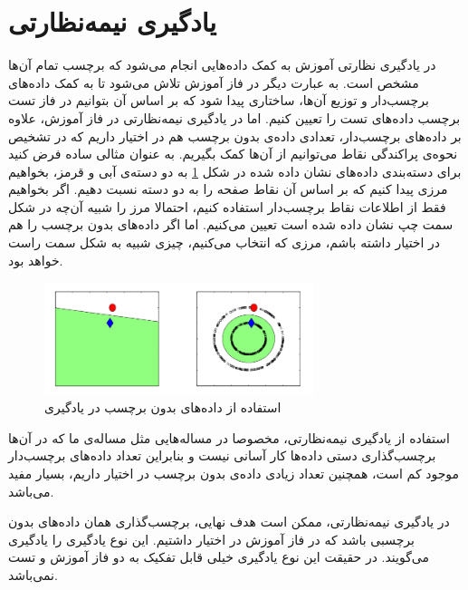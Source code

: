 \documentclass[11pt]{article}
\begin{document}
\section{
یادگیری نیمه‌نظارتی
}
در یادگیری نظارتی
آموزش به کمک داده‌هایی انجام می‌شود که برچسب تمام آن‌ها مشخص است. به عبارت دیگر در فاز آموزش تلاش می‌شود تا به کمک داده‌های برچسب‌دار و توزیع آن‌ها، ساختاری پیدا شود که بر اساس آن بتوانیم در فاز تست برچسب داده‌های تست را تعیین کنیم. اما در یادگیری نیمه‌نظارتی 
در فاز آموزش، علاوه بر داده‌های برچسب‌دار، تعدادی داده‌ی بدون برچسب هم در اختیار داریم که در تشخیص نحوه‌ی پراکندگی نقاط می‌توانیم از آن‌ها کمک بگیریم. به عنوان مثالی ساده فرض کنید برای دسته‌بندی داده‌های نشان داده شده در شکل \ref{fig:SSL} به دو دسته‌ی آبی و قرمز، بخواهیم مرزی پیدا کنیم که بر اساس آن نقاط صفحه را به دو دسته نسبت دهیم. اگر بخواهیم فقط از اطلاعات نقاط برچسب‌دار استفاده کنیم، احتمالا مرز را شبیه آن‌چه در شکل سمت چپ نشان داده شده است تعیین می‌کنیم. اما اگر  داده‌های بدون برچسب را هم در اختیار داشته باشم، مرزی که انتخاب می‌کنیم، چیزی شبیه به شکل سمت راست خواهد بود.		
\begin{figure}[h!]
  \begin{center}
    \includegraphics[width=0.7\textwidth]{images/semisupervised_learning.png}
    \caption{استفاده از داده‌های بدون برچسب در یادگیری \cite{Belkin_semisupervised}}
    \label{fig:SSL}
  \end{center}
\end{figure}

استفاده از یادگیری نیمه‌نظارتی، مخصوصا در مساله‌هایی مثل مساله‌ی ما که در آن‌ها برچسب‌گذاری دستی داده‌ها کار آسانی نیست و بنابراین تعداد داده‌های برچسب‌دار موجود کم است، همچنین تعداد زیادی داده‌ی بدون برچسب در اختیار داریم، بسیار مفید می‌باشد.

در یادگیری نیمه‌نظارتی، ممکن است هدف نهایی، برچسب‌گذاری همان داده‌های بدون برچسبی باشد که در فاز آموزش در اختیار داشتیم. این نوع یادگیری را یادگیری \transductive{} می‌گویند. در حقیقت این نوع یادگیری خیلی قابل تفکیک به دو فاز آموزش و تست نمی‌باشد.%
\end{document}
